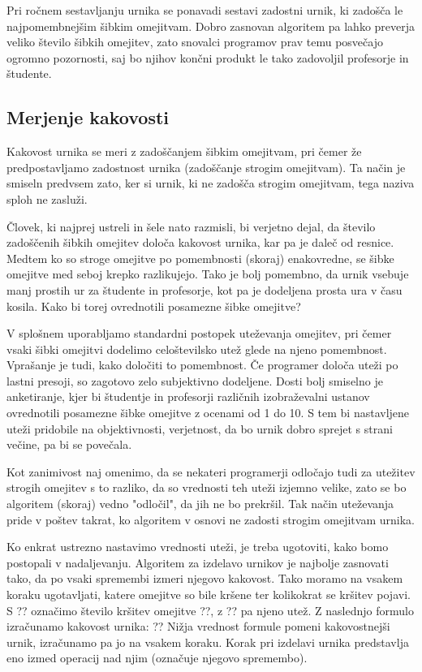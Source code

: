 \documentclass[10pt,a4paper]{article}
\begin{document}
Pri ročnem sestavljanju urnika se ponavadi sestavi zadostni urnik, ki zadošča le
najpomembnejšim šibkim omejitvam. Dobro zasnovan algoritem pa lahko preverja veliko
število šibkih omejitev, zato snovalci programov prav temu posvečajo ogromno pozornosti,
saj bo njihov končni produkt le tako zadovoljil profesorje in študente.

\subsection{Merjenje kakovosti}

Kakovost urnika se meri z zadoščanjem šibkim omejitvam, pri čemer že predpostavljamo
zadostnost urnika (zadoščanje strogim omejitvam). Ta način je smiseln predvsem zato,
ker si urnik, ki ne zadošča strogim omejitvam, tega naziva sploh ne zasluži.

Človek, ki najprej ustreli in šele nato razmisli, bi verjetno dejal, da število
zadoščenih šibkih omejitev določa kakovost urnika, kar pa je daleč od resnice. Medtem
ko so stroge omejitve po pomembnosti (skoraj) enakovredne, se šibke omejitve med seboj
krepko razlikujejo. Tako je bolj pomembno, da urnik vsebuje manj prostih ur za
študente in profesorje, kot pa je dodeljena prosta ura v času kosila. Kako bi torej
ovrednotili posamezne šibke omejitve?

V splošnem uporabljamo standardni postopek uteževanja omejitev, pri čemer vsaki šibki
omejitvi dodelimo celoštevilsko utež glede na njeno pomembnost. Vprašanje je tudi, kako
določiti to pomembnost. Če programer določa uteži po lastni presoji, so zagotovo zelo
subjektivno dodeljene. Dosti bolj smiselno je anketiranje, kjer bi študentje in profesorji
različnih izobraževalni ustanov ovrednotili posamezne šibke omejitve z ocenami od 1 do 10.
S tem bi nastavljene uteži pridobile na objektivnosti, verjetnost, da bo urnik dobro
sprejet s strani večine, pa bi se povečala.

Kot zanimivost naj omenimo, da se nekateri programerji odločajo tudi za utežitev strogih
omejitev s to razliko, da so vrednosti teh uteži izjemno velike, zato se bo algoritem
(skoraj) vedno "odločil", da jih ne bo prekršil. Tak način uteževanja pride v poštev
takrat, ko algoritem v osnovi ne zadosti strogim omejitvam urnika.

Ko enkrat ustrezno nastavimo vrednosti uteži, je treba ugotoviti, kako bomo postopali
v nadaljevanju. Algoritem za izdelavo urnikov je najbolje zasnovati tako, da po vsaki
spremembi izmeri njegovo kakovost. Tako moramo na vsakem koraku ugotavljati, katere
omejitve so bile kršene ter kolikokrat se kršitev pojavi. S ?? označimo število
kršitev omejitve ??, z ?? pa njeno utež. Z naslednjo formulo izračunamo
kakovost urnika:
??
Nižja vrednost formule pomeni kakovostnejši urnik, izračunamo pa jo na vsakem koraku.
Korak pri izdelavi urnika predstavlja eno izmed operacij nad njim (označuje njegovo
spremembo).
\end{document}
